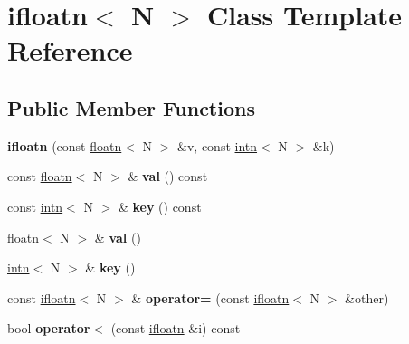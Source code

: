 \hypertarget{classifloatn}{}\section{ifloatn$<$ N $>$ Class Template Reference}
\label{classifloatn}
\subsection*{Public Member Functions}
\begin{DoxyCompactItemize}
\item 
\hypertarget{classifloatn_ae28a7ea70c26043ded183cd8c85e4add}{}{\bfseries ifloatn} (const \hyperlink{classprimitive}{floatn}$<$ N $>$ \&v, const \hyperlink{classprimitive}{intn}$<$ N $>$ \&k)\label{classifloatn_ae28a7ea70c26043ded183cd8c85e4add}

\item 
\hypertarget{classifloatn_a5f04e357bb5d2862bfc81c4e80cdc448}{}const \hyperlink{classprimitive}{floatn}$<$ N $>$ \& {\bfseries val} () const \label{classifloatn_a5f04e357bb5d2862bfc81c4e80cdc448}

\item 
\hypertarget{classifloatn_ad9105e98e1a72be41a1a1eb98ff20b06}{}const \hyperlink{classprimitive}{intn}$<$ N $>$ \& {\bfseries key} () const \label{classifloatn_ad9105e98e1a72be41a1a1eb98ff20b06}

\item 
\hypertarget{classifloatn_a3e1052ebea54413dc5eb48da500741e4}{}\hyperlink{classprimitive}{floatn}$<$ N $>$ \& {\bfseries val} ()\label{classifloatn_a3e1052ebea54413dc5eb48da500741e4}

\item 
\hypertarget{classifloatn_aad1c244555efb5e6e0809af69321797f}{}\hyperlink{classprimitive}{intn}$<$ N $>$ \& {\bfseries key} ()\label{classifloatn_aad1c244555efb5e6e0809af69321797f}

\item 
\hypertarget{classifloatn_a083935b6c13dbcdd3a962fab73ff91b1}{}const \hyperlink{classifloatn}{ifloatn}$<$ N $>$ \& {\bfseries operator=} (const \hyperlink{classifloatn}{ifloatn}$<$ N $>$ \&other)\label{classifloatn_a083935b6c13dbcdd3a962fab73ff91b1}

\item 
\hypertarget{classifloatn_a7970284682bb83be713e03bef0fbc1cf}{}bool {\bfseries operator$<$} (const \hyperlink{classifloatn}{ifloatn} \&i) const \label{classifloatn_a7970284682bb83be713e03bef0fbc1cf}

\end{DoxyCompactItemize}
